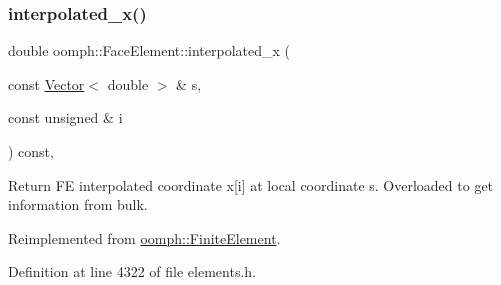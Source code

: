 \subsubsection{\texorpdfstring{interpolated\+\_\+x()}{interpolated\_x()}\hspace{0.1cm}{\footnotesize\ttfamily [1/4]}}
{\footnotesize\ttfamily double oomph\+::\+Face\+Element\+::interpolated\+\_\+x (\begin{DoxyParamCaption}\item[{const \hyperlink{classoomph_1_1Vector}{Vector}$<$ double $>$ \&}]{s,  }\item[{const unsigned \&}]{i }\end{DoxyParamCaption}) const\hspace{0.3cm}{\ttfamily [inline]}, {\ttfamily [virtual]}}



Return FE interpolated coordinate x\mbox{[}i\mbox{]} at local coordinate s. Overloaded to get information from bulk. 



Reimplemented from \hyperlink{classoomph_1_1FiniteElement_a5a9c1ead9819cd17603096e63087020f}{oomph\+::\+Finite\+Element}.



Definition at line 4322 of file elements.\+h.



